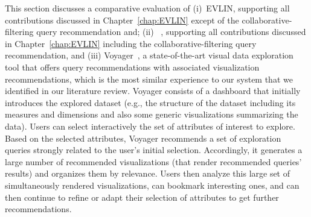 
This section discusses a comparative evaluation of (i)~EVLIN, supporting %
all contributions discussed in Chapter~\ref{chap:EVLIN} except of the collaborative-filtering query recommendation and; (ii)~ \prototypeTwo{}, supporting all contributions discussed in Chapter~\ref{chap:EVLIN} including the collaborative-filtering query recommendation, and (iii) Voyager~\cite{Wongsuphasawat:2017}, a state-of-the-art visual data exploration tool that offers query recommendations with associated visualization recommendations, which is the most similar experience to our system that we identified in our literature review. Voyager consists of a dashboard that initially introduces the explored dataset (e.g., the structure of the dataset including its measures and dimensions and also some generic visualizations summarizing the data). Users can select interactively the set of attributes of interest to explore. Based on the selected attributes, Voyager recommends a set of exploration queries strongly related to the user's initial selection. Accordingly, it generates a large number of recommended visualizations (that render recommended queries' results) and organizes them by relevance. Users then analyze this large set of simultaneously rendered visualizations, can bookmark interesting ones, and can then continue to refine or adapt their selection of attributes to get further recommendations.

